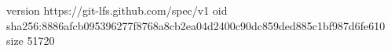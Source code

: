 version https://git-lfs.github.com/spec/v1
oid sha256:8886afcb095396277f8768a8cb2ea04d2400c90dc859ded885c1bf987d6fe610
size 51720
